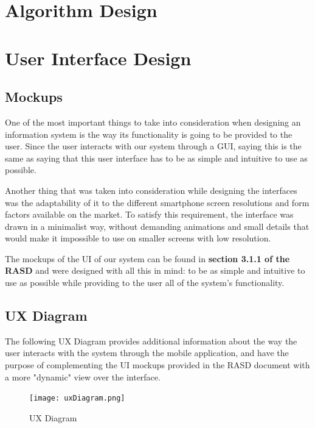 \documentclass[12pt]{article}
\begin{document}
\section{Algorithm Design}

\section{User Interface Design}
\subsection{Mockups}
One of the most important things to take into consideration when designing an information system is the way its functionality is going to be provided to the user. Since the user interacts with our system through a GUI, saying this is the same as saying that this user interface has to be as simple and intuitive to use as possible.

Another thing that was taken into consideration while designing the interfaces was the adaptability of it to the different smartphone screen resolutions and form factors available on the market. To satisfy this requirement, the interface was drawn in a minimalist way, without demanding animations and small details that would make it impossible to use on smaller screens with low resolution.

The mockups of the UI of our system can be found in \textbf{section 3.1.1 of the RASD} and were designed with all this in mind: to be as simple and intuitive to use as possible while providing to the user all of the system's functionality.
\subsection{UX Diagram}
The following UX Diagram provides additional information about the way the user interacts with the system through the mobile application, and have the purpose of complementing the UI mockups provided in the RASD document with a more "dynamic" view over the interface.

\begin{figure}[H]
    \centering
    \texttt{[image: uxDiagram.png]}
    \caption{UX Diagram}
    \label{fig:uxDiagram}
\end{figure}
\end{document}
